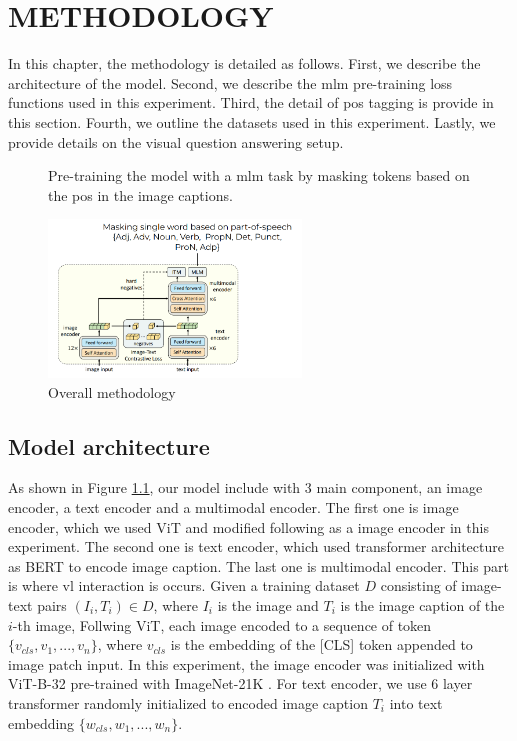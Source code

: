 \chapter{METHODOLOGY}
In this chapter, the methodology is detailed as follows. 
First, we describe the architecture of the model. 
Second, we describe the \acrshort{mlm} pre-training loss functions used in this experiment.
Third, the detail of \acrshort{pos} tagging is provide in this section.
Fourth, we outline the datasets used in this experiment. 
Lastly, we provide details on the visual question answering setup.

\begin{figure}[h]
    \caption{Overall methodology}
    \label{fig:overview}
    Pre-training the model with a \acrshort{mlm} task by masking tokens based on the \acrshort{pos} in the image captions.
    \begin{center}
        \includegraphics[width=0.6\textwidth]{Images/overview.png}
    \end{center}
    \small
\end{figure}

\section{Model architecture}
As shown in Figure \ref{fig:overview}, our model include with 3 main component, an image encoder, a text encoder and a multimodal encoder. 
The first one is image encoder, which we used ViT \cite{vit} and modified following \cite{clip} as a image encoder in this experiment.
The second one is text encoder, which used transformer architecture as BERT \cite{bert} to encode image caption.
The last one is multimodal encoder.
This part is where \acrshort{vl} interaction is occurs.
Given a training dataset \(D\) consisting of image-text pairs \((I_i, T_i) \in D\), where \(I_i\) is the image and \(T_i\) is the image caption of the \(i\)-th image, 
Follwing ViT, each image encoded to a sequence of token \(\{v_{cls}, v_1, ..., v_n\}\), where \(v_{cls}\) is the embedding of the [CLS] token appended to image patch input.
In this experiment, the image encoder was initialized with ViT-B-32 pre-trained with ImageNet-21K \cite{imagenet}.
For text encoder, we use 6 layer transformer randomly initialized to encoded image caption \(T_i\) into text embedding \(\{w_{cls}, w_1, ...,w_n\}\).
